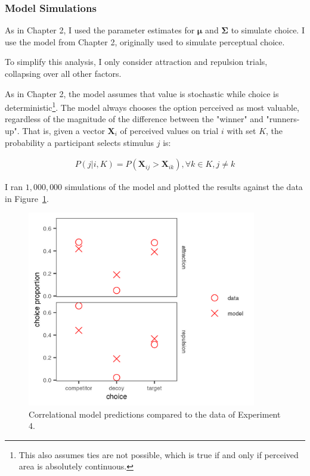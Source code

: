 \subsubsection{Model Simulations}

As in Chapter 2, I used the parameter estimates for $\boldsymbol{\mu}$ and $\boldsymbol{\Sigma}$ to simulate choice. I use the model from Chapter 2, originally used to simulate perceptual choice. 

To simplify this analysis, I only consider attraction and repulsion trials, collapsing over all other factors. 

As in Chapter 2, the model assumes that value is stochastic while choice is deterministic\footnote{This also assumes ties are not possible, which is true if and only if perceived area is absolutely continuous.}. The model always chooses the option perceived as most valuable, regardless of the magnitude of the difference between the "winner" and "runners-up". That is, given a vector $\mathbf{X}_i$ of perceived values on trial $i$ with set $K$, the probability a participant selects stimulus $j$ is:

\begin{align}
   P(j|i,K)=P(\mathbf{X}_{ij}>\mathbf{X}_{ik}), \forall k \in K, j \neq k
   \label{eqn:pchoice_price}
\end{align}

I ran $1,000,000$ simulations of the model and plotted the results against the data in Figure~\ref{fig:bayes_choice_sim_preds}.

\begin{figure}
    \includegraphics[scale=.5,width=100mm]{figures/bayes_choice_sim_preds.jpeg}
    \caption{Correlational model predictions compared to the data of Experiment 4.}
    \label{fig:bayes_choice_sim_preds}
\end{figure}

